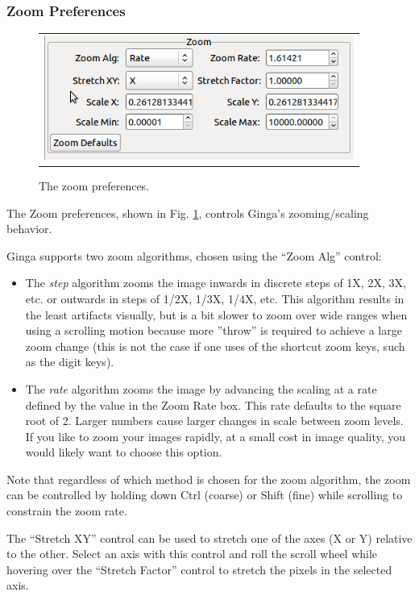 \documentclass[11pt]{report}
\begin{document}
\subsubsection{Zoom Preferences}
\begin{figure}
  \begin{center}
    \begin{tabular}{c}
      \includegraphics[width=4in]{zoom-prefs.png}
    \end{tabular}
  \end{center}
  \caption[example] 
          { \label{fig:prefs-zoom} 
            The zoom preferences.} 
\end{figure} 
The Zoom preferences, shown in Fig. \ref{fig:prefs-zoom}, controls
Ginga's zooming/scaling behavior.

Ginga supports two zoom algorithms, chosen using the ``Zoom Alg'' control:
\begin{itemize}
\item The \emph{step} algorithm zooms the image inwards in discrete
  steps of 1X, 2X, 3X, etc. or outwards in steps of 1/2X, 1/3X, 1/4X,
  etc.  This algorithm results in the least artifacts visually, but is a
  bit slower to zoom over wide ranges when using a scrolling motion
  because more ''throw'' is required to achieve a large zoom change
  (this is not the case if one uses of the shortcut zoom keys, such as
  the digit keys). 
\item The \emph{rate} algorithm zooms the image by advancing the scaling at
  a rate defined by the value in the Zoom Rate box.  This rate defaults
  to the square root of 2.  Larger numbers cause larger changes in scale
  between zoom levels.  If you like to zoom your images rapidly, at a
  small cost in image quality, you would likely want to choose this
  option. 
\end{itemize}
Note that regardless of which method is chosen for the zoom algorithm,
the zoom can be controlled by holding down Ctrl (coarse) or Shift
(fine) while scrolling to constrain the zoom rate.

The ``Stretch XY'' control can be used to stretch one of the axes (X or
Y) relative to the other.  Select an axis with this control and roll the
scroll wheel while hovering over the ``Stretch Factor'' control to
stretch the pixels in the selected axis.
\end{document}
